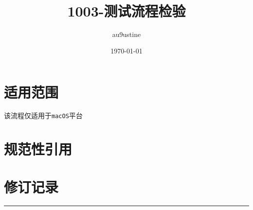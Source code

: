 \documentclass[12pt,a4paper]{report}
\title{1003-测试流程检验}
\date{\today}
\author{au9ustine}
\begin{document}
\maketitle

\renewcommand{\contentsname}{目录}
\tableofcontents

\chapter{适用范围}
该流程仅适用于\texttt{macOS}平台

\chapter{规范性引用}

\appendix
\renewcommand{\contentsname}{附录}
\chapter{修订记录}

\rule[-0.3em]{0.38em}{1.1em}%
\end{document}
